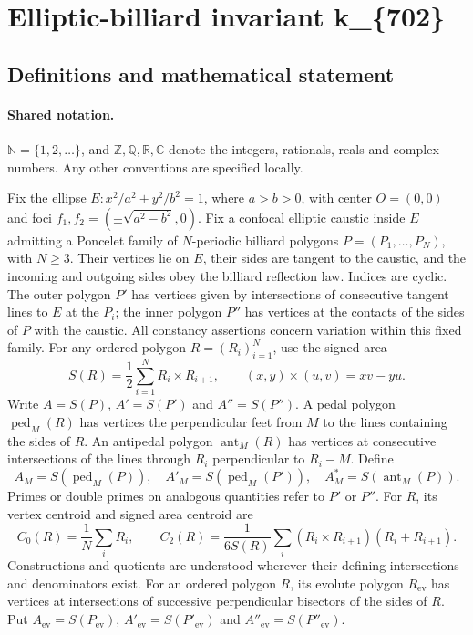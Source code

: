 \documentclass[11pt]{article}
\begin{document}
\section{Elliptic-billiard invariant k\_\{702\}}\label{statement}

\subsection{Definitions and mathematical statement}

\paragraph{Shared notation.}$\mathbb N=\{1,2,\ldots\}$, and $\mathbb Z,\mathbb Q,\mathbb R,\mathbb C$ denote the integers, rationals, reals and complex numbers. Any other conventions are specified locally.


Fix the ellipse $E:x^2/a^2+y^2/b^2=1$, where $a>b>0$, with center $O=(0,0)$ and foci $f_1,f_2=(\pm\sqrt{a^2-b^2},0)$. Fix a confocal elliptic caustic inside $E$ admitting a Poncelet family of $N$-periodic billiard polygons $P=(P_1,\ldots,P_N)$, with $N\geq3$. Their vertices lie on $E$, their sides are tangent to the caustic, and the incoming and outgoing sides obey the billiard reflection law. Indices are cyclic. The outer polygon $P'$ has vertices given by intersections of consecutive tangent lines to $E$ at the $P_i$; the inner polygon $P''$ has vertices at the contacts of the sides of $P$ with the caustic. All constancy assertions concern variation within this fixed family.
For any ordered polygon $R=(R_i)_{i=1}^N$, use the signed area
\[S(R)=\frac12\sum_{i=1}^N R_i\times R_{i+1},\qquad (x,y)\times(u,v)=xv-yu.\]
Write $A=S(P)$, $A'=S(P')$ and $A''=S(P'')$. A pedal polygon $\operatorname{ped}_M(R)$ has vertices the perpendicular feet from $M$ to the lines containing the sides of $R$. An antipedal polygon $\operatorname{ant}_M(R)$ has vertices at consecutive intersections of the lines through $R_i$ perpendicular to $R_i-M$. Define
\[A_M=S(\operatorname{ped}_M(P)),\quad A'_M=S(\operatorname{ped}_M(P')),\quad A_M^*=S(\operatorname{ant}_M(P)).\]
Primes or double primes on analogous quantities refer to $P'$ or $P''$. For $R$, its vertex centroid and signed area centroid are
\[C_0(R)=\frac1N\sum_i R_i,\qquad C_2(R)=\frac{1}{6S(R)}\sum_i(R_i\times R_{i+1})(R_i+R_{i+1}).\]
Constructions and quotients are understood wherever their defining intersections and denominators exist.
For an ordered polygon $R$, its evolute polygon $R_{\mathrm{ev}}$ has vertices at intersections of successive perpendicular bisectors of the sides of $R$. Put $A_{\mathrm{ev}}=S(P_{\mathrm{ev}})$, $A'_{\mathrm{ev}}=S(P'_{\mathrm{ev}})$ and $A''_{\mathrm{ev}}=S(P''_{\mathrm{ev}})$.
\end{document}
